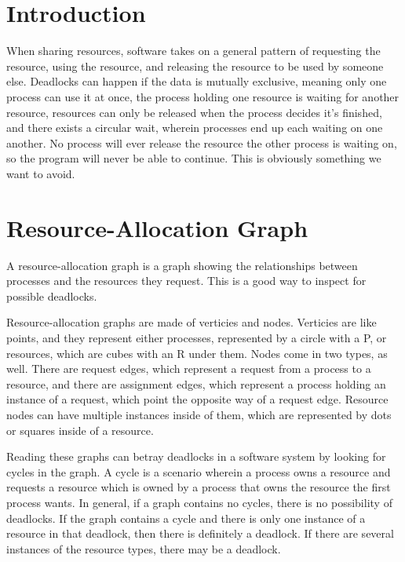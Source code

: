 \documentclass{article}
\begin{document}
\maketitle
\tableofcontents

\section{Introduction}
When sharing resources, software takes on a general pattern of requesting the
resource, using the resource, and releasing the resource to be used by someone
else. Deadlocks can happen if the data is mutually exclusive, meaning only one
process can use it at once, the process holding one resource is waiting for
another resource, resources can only be released when the process decides it's
finished, and there exists a circular wait, wherein processes end up each
waiting on one another. No process will ever release the resource the other
process is waiting on, so the program will never be able to continue. This is
obviously something we want to avoid.

\section{Resource-Allocation Graph}
A resource-allocation graph is a graph showing the relationships between
processes and the resources they request. This is a good way to inspect for
possible deadlocks.

Resource-allocation graphs are made of verticies and nodes. Verticies are like
points, and they represent either processes, represented by a circle with a P,
or resources, which are cubes with an R under them. Nodes come in two types, as
well. There are request edges, which represent a request from a process to a
resource, and there are assignment edges, which represent a process holding an
instance of a request, which point the opposite way of a request edge. Resource
nodes can have multiple instances inside of them, which are represented by dots
or squares inside of a resource.

Reading these graphs can betray deadlocks in a software system by looking for
cycles in the graph. A cycle is a scenario wherein a process owns a resource
and requests a resource which is owned by a process that owns the resource the
first process wants. In general, if a graph contains no cycles, there is no
possibility of deadlocks. If the graph contains a cycle and there is only one
instance of a resource in that deadlock, then there is definitely a deadlock.
If there are several instances of the resource types, there may be a deadlock.
\end{document}
